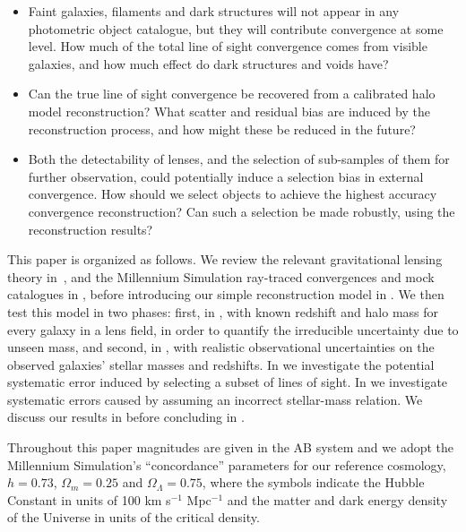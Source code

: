 \documentclass[useAMS,usenatbib,a4paper]{mn2e}
\begin{document}
\begin{itemize}

\item Faint galaxies, filaments and dark structures will not appear in
any photometric object catalogue, but they will contribute convergence at
some level. How much of the total line of sight 
convergence comes from visible
galaxies, and how much effect do dark structures and voids have? 

\item Can the true line of sight convergence be recovered from a calibrated
halo model reconstruction? What scatter and residual bias are induced by the
reconstruction process, and how might these be reduced in the future? 

\item Both the detectability of lenses, and the selection of sub-samples of
them for further observation, could potentially induce a selection bias in
external convergence. How should we select objects to achieve the highest
accuracy convergence reconstruction? Can such a selection be made robustly,
using the reconstruction results?

\end{itemize}


This paper is organized as follows. We review the relevant gravitational
lensing theory in~, and the Millennium Simulation
ray-traced convergences and mock catalogues in , before
introducing our simple reconstruction  model in . We
then test this model in two phases: first, in , with
known redshift and halo mass for every galaxy in a lens field, in order
to quantify the irreducible uncertainty due to unseen mass, and second,
in , with realistic observational uncertainties on
the observed galaxies' stellar masses and redshifts. In
 we investigate the potential systematic error induced
by selecting a subset of lines of sight. In
 we investigate systematic errors caused by assuming an incorrect stellar-mass relation. We discuss our results in
 before concluding in .

Throughout this paper magnitudes are given in the AB system and
we adopt the Millennium Simulation's ``concordance'' parameters for our reference cosmology, \ie
$h=0.73$, $\Omega_m=0.25$ and $\Omega_\Lambda=0.75$, where the symbols indicate
the Hubble Constant in units of 100 km s$^{-1}$ Mpc$^{-1}$ and the matter and
dark energy density of the Universe in units of the critical density.
\end{document}
